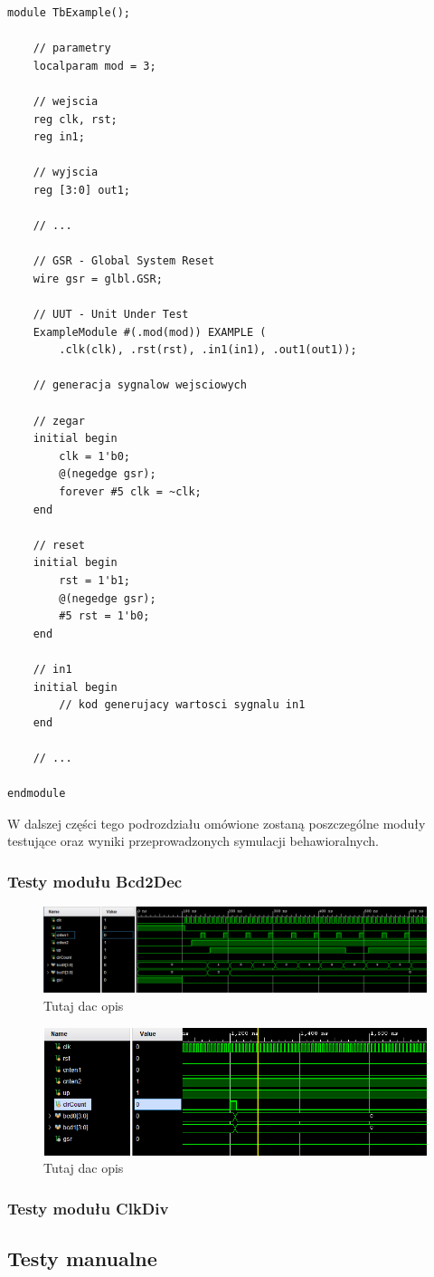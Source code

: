 \documentclass[12pt] {article}
\begin{document}
\begin{lstlisting}[style={verilog-style}, caption={Uproszczona struktura wykonanych modułów testujących}, label={lst:testy}]
module TbExample();
    
    // parametry    
    localparam mod = 3;    
    
    // wejscia
    reg clk, rst;
    reg in1;
    
    // wyjscia
    reg [3:0] out1; 
    
    // ...

    // GSR - Global System Reset
    wire gsr = glbl.GSR;

    // UUT - Unit Under Test
    ExampleModule #(.mod(mod)) EXAMPLE (
        .clk(clk), .rst(rst), .in1(in1), .out1(out1));

    // generacja sygnalow wejsciowych

    // zegar
    initial begin
        clk = 1'b0;
        @(negedge gsr);
        forever #5 clk = ~clk;
    end
    
    // reset
    initial begin
        rst = 1'b1;
        @(negedge gsr);
        #5 rst = 1'b0;
    end
    
    // in1
    initial begin 
        // kod generujacy wartosci sygnalu in1
    end
    
    // ...
    
endmodule
\end{lstlisting}

W dalszej części tego podrozdziału omówione zostaną poszczególne moduły testujące oraz wyniki przeprowadzonych symulacji behawioralnych. 

\subsubsection{Testy modułu Bcd2Dec}


\begin{figure}[H]
\centering
\includegraphics[width=\textwidth]{res/behav_sims/Bcd2Dec_behavSim_1.png}
\caption{Tutaj dac opis}
\end{figure}

\begin{figure}[H]
\centering
\includegraphics[width=\textwidth]{res/behav_sims/Bcd2Dec_behavSim_2.png}
\caption{Tutaj dac opis}
\end{figure}


\subsubsection{Testy modułu ClkDiv}

\subsection{Testy manualne}
\end{document}
